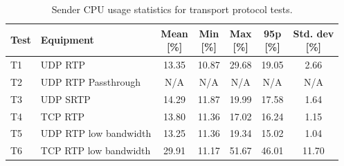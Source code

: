 \begin{table}[H]
    \centering
    \caption{Sender CPU usage statistics for transport protocol tests.}\label{tab:cpu_transport}
    \begin{tabular}{|l|l|c|c|c|c|c|}
    \hline
    \textbf{Test} & \textbf{Equipment} & \shortstack{\textbf{Mean}\\ \textbf{[\%]}} & \shortstack{\textbf{Min}\\ \textbf{[\%]}} & \shortstack{\textbf{Max}\\ \textbf{[\%]}} & \shortstack{\textbf{95p}\\ \textbf{[\%]}} & \shortstack{\textbf{Std. dev}\\ \textbf{[\%]}}\\
    \hline
    T1 & UDP RTP & 13.35 & 10.87 & 29.68 & 19.05 & 2.66\\
    \hline
    T2 & UDP RTP Passthrough & N/A & N/A & N/A & N/A & N/A\\
    \hline
    T3 & UDP SRTP & 14.29 & 11.87 & 19.99 & 17.58 & 1.64\\
    \hline
    T4 & TCP RTP & 13.80 & 11.36 & 17.02 & 16.24 & 1.15\\
    \hline
    T5 & UDP RTP low bandwidth & 13.25 & 11.36 & 19.34 & 15.02 & 1.04\\
    \hline
    T6 & TCP RTP low bandwidth & 29.91 & 11.17 & 51.67 & 46.01 & 11.70\\
    \hline
    \end{tabular}
\end{table}

